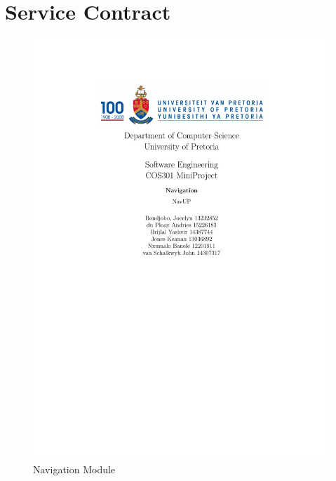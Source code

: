 \documentclass[a4paper,10pt]{article}
\begin{document}
\section{Service Contract}
		\begin{figure}[h]
		\includegraphics[scale=0.4]{Service_Contract}
		\caption{Navigation Module}
		\end{figure}

\newpage
\clearpage
\end{document}
